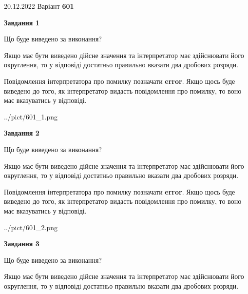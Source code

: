 \documentclass[12pt, ukrainian]{article}
\begin{document}
{20.12.2022 Варіант \No \textbf { 601 }\par}
{
\begin {Large}

{\begin {center}\textbf{Завдання 1}\end {center}}\par
Що буде виведено за виконання? \par

Якщо має бути виведено дійсне значення та інтерпретатор має здійснювати його округлення, 
то у відповіді достатньо правильно вказати два дробових розряди.

Повідомлення інтерпретатора про помилку позначати \textbf{error}.
Якщо щось буде виведено до того, як інтерпретатор видасть повідомлення про помилку, 
то воно має вказуватись у відповіді. \par

\begin{center}
	{../pict/601_1.png}
\end{center}
\newpage

{\begin {center}\textbf{Завдання 2}\end {center}}\par
Що буде виведено за виконання? \par

Якщо має бути виведено дійсне значення та інтерпретатор має здійснювати його округлення, 
то у відповіді достатньо правильно вказати два дробових розряди.

Повідомлення інтерпретатора про помилку позначати \textbf{error}.
Якщо щось буде виведено до того, як інтерпретатор видасть повідомлення про помилку, 
то воно має вказуватись у відповіді. \par

\begin{center}
	{../pict/601_2.png}
\end{center}
\newpage

{\begin {center}\textbf{Завдання 3}\end {center}}\par
Що буде виведено за виконання? \par

Якщо має бути виведено дійсне значення та інтерпретатор має здійснювати його округлення, 
то у відповіді достатньо правильно вказати два дробових розряди.


\end{Large}}
\end{document}
